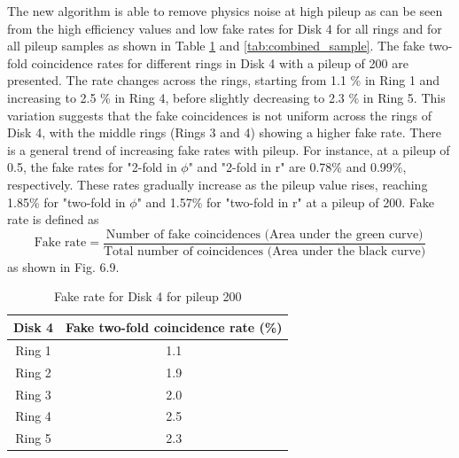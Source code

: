 \newpage
The new algorithm is able to remove physics noise at high pileup as can be seen from the high efficiency values and low fake rates for Disk 4 for all rings and for all pileup samples as shown in Table  \ref{tab:sample} and \ref{tab:combined_sample}. The fake two-fold coincidence rates for different rings in Disk 4 with a pileup of 200 are presented. The rate changes across the rings, starting from 1.1 \% in Ring 1 and increasing to 2.5 \% in Ring 4, before slightly decreasing to 2.3 \% in Ring 5. This variation suggests that the fake coincidences is not uniform across the rings of Disk 4, with the middle rings (Rings 3 and 4) showing a higher fake rate. There is a general trend of increasing fake rates with pileup. For instance, at a pileup of 0.5, the fake rates for "2-fold in $\phi$" and "2-fold in r" are 0.78\% and 0.99\%, respectively. These rates gradually increase as the pileup value rises, reaching 1.85\% for "two-fold in $\phi$" and 1.57\% for "two-fold in r" at a pileup of 200. Fake rate is defined as\begin{equation}
\text{Fake rate} = \frac{\text{Number of fake coincidences (Area under the green curve)}}{\text{Total number of coincidences (Area under the black curve)}}
\end{equation} as shown in Fig. 6.9.

\begin{table}[H]
  \centering
  \caption{Fake rate for Disk 4 for pileup 200}
  \begin{tabular}{cc}
    \textbf{Disk 4} & \textbf{Fake two-fold coincidence rate (\%)} \\
    \hline
    Ring 1 &  1.1\\
    Ring 2 &  1.9\\
    Ring 3 &  2.0\\
    Ring 4 &  2.5\\
    Ring 5 &  2.3\\
  \end{tabular}
  \label{tab:sample}
\end{table}

